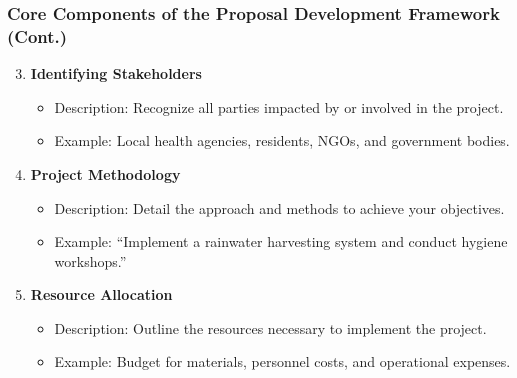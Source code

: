 \documentclass[aspectratio=169]{beamer}
\begin{document}
\begin{frame}[fragile]
    \frametitle{Core Components of the Proposal Development Framework (Cont.)}
    \begin{enumerate}
        \setcounter{enumi}{2}
        \item \textbf{Identifying Stakeholders}
        \begin{itemize}
            \item Description: Recognize all parties impacted by or involved in the project.
            \item Example: Local health agencies, residents, NGOs, and government bodies.
        \end{itemize}

        \item \textbf{Project Methodology}
        \begin{itemize}
            \item Description: Detail the approach and methods to achieve your objectives.
            \item Example: “Implement a rainwater harvesting system and conduct hygiene workshops.”
        \end{itemize}

        \item \textbf{Resource Allocation}
        \begin{itemize}
            \item Description: Outline the resources necessary to implement the project.
            \item Example: Budget for materials, personnel costs, and operational expenses.
        \end{itemize}
    \end{enumerate}
\end{frame}
\end{document}
